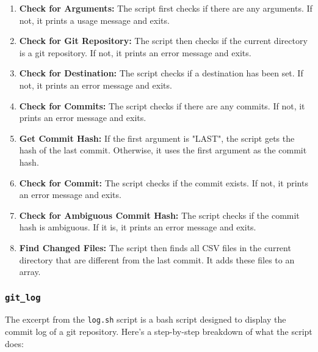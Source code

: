 \documentclass{article}
\begin{document}
\begin{enumerate}
    \item \textbf{Check for Arguments:} The script first checks if there are any arguments. If not, it prints a usage message and exits.
    
    \item \textbf{Check for Git Repository:} The script then checks if the current directory is a git repository. If not, it prints an error message and exits.
    
    \item \textbf{Check for Destination:} The script checks if a destination has been set. If not, it prints an error message and exits.
    
    \item \textbf{Check for Commits:} The script checks if there are any commits. If not, it prints an error message and exits.
    
    \item \textbf{Get Commit Hash:} If the first argument is "LAST", the script gets the hash of the last commit. Otherwise, it uses the first argument as the commit hash.
    
    \item \textbf{Check for Commit:} The script checks if the commit exists. If not, it prints an error message and exits.
    
    \item \textbf{Check for Ambiguous Commit Hash:} The script checks if the commit hash is ambiguous. If it is, it prints an error message and exits.
    
    \item \textbf{Find Changed Files:} The script then finds all CSV files in the current directory that are different from the last commit. It adds these files to an array.
\end{enumerate}

\subsubsection{\texttt{git\_log}}
The excerpt from the \texttt{log.sh} script is a bash script designed to display the commit log of a git repository. Here's a step-by-step breakdown of what the script does:
\end{document}
